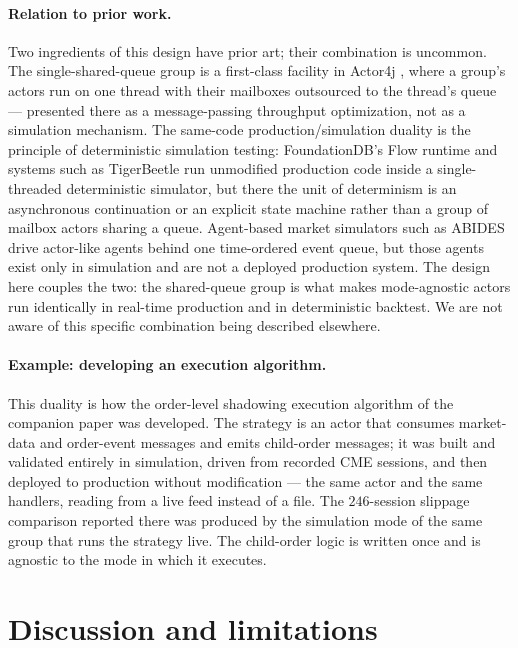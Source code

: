 \documentclass[11pt]{article}
\begin{document}
\paragraph{Relation to prior work.} Two ingredients of this design have prior
art; their combination is uncommon. The single-shared-queue group is a
first-class facility in Actor4j \cite{actor4j2018}, where a group's actors run on
one thread with their mailboxes outsourced to the thread's queue --- presented
there as a message-passing throughput optimization, not as a simulation
mechanism. The same-code production/simulation duality is the principle of
deterministic simulation testing: FoundationDB's Flow runtime \cite{foundationdb}
and systems such as TigerBeetle run unmodified production code inside a
single-threaded deterministic simulator, but there the unit of determinism is an
asynchronous continuation or an explicit state machine rather than a group of
mailbox actors sharing a queue. Agent-based market simulators such as ABIDES
\cite{abides} drive actor-like agents behind one time-ordered event queue, but
those agents exist only in simulation and are not a deployed production system.
The design here couples the two: the shared-queue group is what makes
mode-agnostic actors run identically in real-time production and in deterministic
backtest. We are not aware of this specific combination being described
elsewhere.

\paragraph{Example: developing an execution algorithm.} This duality is how the
order-level shadowing execution algorithm of the companion paper \cite{shadowpov}
was developed. The strategy is an actor that consumes market-data and order-event
messages and emits child-order messages; it was built and validated entirely in
simulation, driven from recorded CME sessions, and then deployed to production
without modification --- the same actor and the same handlers, reading from a
live feed instead of a file. The $246$-session slippage comparison reported there
was produced by the simulation mode of the same group that runs the strategy
live. The child-order logic is written once and is agnostic to the mode in which
it executes.

\section{Discussion and limitations}
\label{sec:disc}
\end{document}

